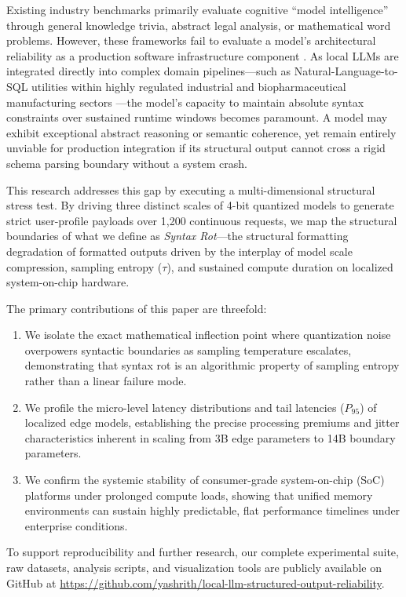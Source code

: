 \documentclass[11pt,journal,compsoc,onecolumn]{IEEEtran}
\begin{document}
Existing industry benchmarks primarily evaluate cognitive ``model intelligence'' through general knowledge trivia, abstract legal analysis, or mathematical word problems. However, these frameworks fail to evaluate a model's architectural reliability as a production software infrastructure component \cite{ay2026}. As local LLMs are integrated directly into complex domain pipelines—such as Natural-Language-to-SQL utilities within highly regulated industrial and biopharmaceutical manufacturing sectors \cite{bhetwal2026}—the model's capacity to maintain absolute syntax constraints over sustained runtime windows becomes paramount. A model may exhibit exceptional abstract reasoning or semantic coherence, yet remain entirely unviable for production integration if its structural output cannot cross a rigid schema parsing boundary without a system crash.

This research addresses this gap by executing a multi-dimensional structural stress test. By driving three distinct scales of 4-bit quantized models to generate strict user-profile payloads over 1,200 continuous requests, we map the structural boundaries of what we define as \textit{Syntax Rot}—the structural formatting degradation of formatted outputs driven by the interplay of model scale compression, sampling entropy ($\tau$), and sustained compute duration on localized system-on-chip hardware.

The primary contributions of this paper are threefold:
\begin{enumerate}
    \item We isolate the exact mathematical inflection point where quantization noise overpowers syntactic boundaries as sampling temperature escalates, demonstrating that syntax rot is an algorithmic property of sampling entropy rather than a linear failure mode.
    \item We profile the micro-level latency distributions and tail latencies ($P_{95}$) of localized edge models, establishing the precise processing premiums and jitter characteristics inherent in scaling from 3B edge parameters to 14B boundary parameters.
    \item We confirm the systemic stability of consumer-grade system-on-chip (SoC) platforms under prolonged compute loads, showing that unified memory environments can sustain highly predictable, flat performance timelines under enterprise conditions.
\end{enumerate}

To support reproducibility and further research, our complete experimental suite, raw datasets, analysis scripts, and visualization tools are publicly available on GitHub at \url{https://github.com/yashrith/local-llm-structured-output-reliability}.
\end{document}
